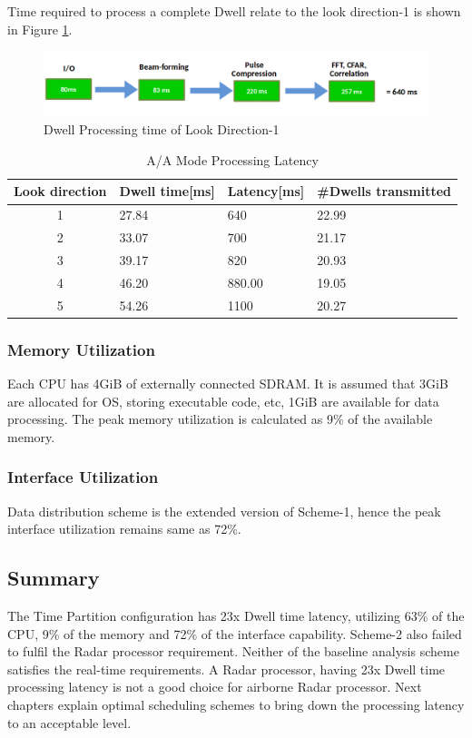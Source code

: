 Time required to process a complete Dwell relate to the look direction-1 is shown in Figure \ref{fig:mm:scheme2_latency_tot}.
\begin{figure}[h!]
	\centering
	\includegraphics[width=145mm]{figures/scheme2_latency_tot}
	\caption{Dwell Processing time of Look Direction-1}
	\label{fig:mm:scheme2_latency_tot}
\end{figure}

\begin{table}[h!]
	\centering
	\begin{tabular}{|c|l|l|l|} 
	 \hline
	 \textbf{Look direction} & \textbf{Dwell time[ms]} & \textbf{Latency[ms]} & \textbf{\#Dwells transmitted} \\
	 \hline
	 1 & 27.84 & 640 & 22.99 \\ \hline
	 2 & 33.07 & 700 & 21.17 \\ \hline
	 3 & 39.17 & 820 & 20.93 \\ \hline
	 4 & 46.20 & 880.00 & 19.05 \\ \hline
	 5 & 54.26 & 1100 & 20.27 \\ \hline
	\end{tabular}
	\caption{A/A Mode Processing Latency}
	\label{tbl:existing_analysis:aa_scheme2_latency}
\end{table}
\FloatBarrier

\subsubsection{Memory Utilization}
\label{sss:scheme2:mem_util}
Each CPU has 4GiB of externally connected SDRAM. It is assumed that 3GiB are allocated for OS, storing executable code, etc, 1GiB are available for data processing. The peak memory utilization is calculated as 9\% of the available memory.

\subsubsection{Interface Utilization}
\label{sss:scheme2:interface_util}
Data distribution scheme is the extended version of Scheme-1, hence the peak interface utilization remains same as 72\%.

\subsection{Summary}
\label{sss:scheme2:sar_summary}
The Time Partition configuration has 23x Dwell time latency, utilizing 63\% of the CPU, 9\% of the memory and 72\% of the interface capability. Scheme-2 also failed to fulfil the Radar processor requirement. Neither of the baseline analysis scheme satisfies the real-time requirements. A Radar processor, having 23x Dwell time processing latency is not a good choice for airborne Radar processor. Next chapters explain optimal scheduling schemes to bring down the processing latency to an acceptable level.



